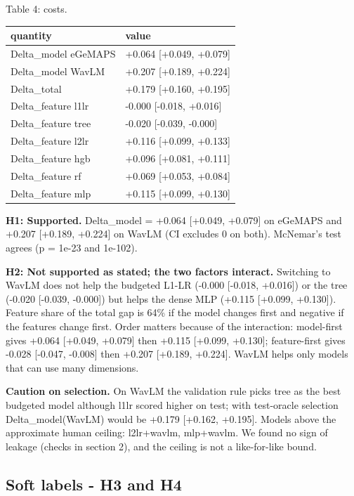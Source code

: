 \documentclass[11pt]{article}
\begin{document}
Table 4: costs.

\begin{longtable}[]{@{}ll@{}}
\toprule\noalign{}
quantity & value \\
\midrule\noalign{}
\endhead
\bottomrule\noalign{}
\endlastfoot
Delta\_model eGeMAPS & +0.064 {[}+0.049, +0.079{]} \\
Delta\_model WavLM & +0.207 {[}+0.189, +0.224{]} \\
Delta\_total & +0.179 {[}+0.160, +0.195{]} \\
Delta\_feature l1lr & -0.000 {[}-0.018, +0.016{]} \\
Delta\_feature tree & -0.020 {[}-0.039, -0.000{]} \\
Delta\_feature l2lr & +0.116 {[}+0.099, +0.133{]} \\
Delta\_feature hgb & +0.096 {[}+0.081, +0.111{]} \\
Delta\_feature rf & +0.069 {[}+0.053, +0.084{]} \\
Delta\_feature mlp & +0.115 {[}+0.099, +0.130{]} \\
\end{longtable}

\textbf{H1: Supported.} Delta\_model = +0.064 {[}+0.049, +0.079{]} on eGeMAPS and +0.207 {[}+0.189, +0.224{]} on WavLM (CI excludes 0 on both). McNemar's test agrees (p = 1e-23 and 1e-102).

\textbf{H2: Not supported as stated; the two factors interact.} Switching to WavLM does not help the budgeted L1-LR (-0.000 {[}-0.018, +0.016{]}) or the tree (-0.020 {[}-0.039, -0.000{]}) but helps the dense MLP (+0.115 {[}+0.099, +0.130{]}). Feature share of the total gap is 64\% if the model changes first and negative if the features change first. Order matters because of the interaction: model-first gives +0.064 {[}+0.049, +0.079{]} then +0.115 {[}+0.099, +0.130{]}; feature-first gives -0.028 {[}-0.047, -0.008{]} then +0.207 {[}+0.189, +0.224{]}. WavLM helps only models that can use many dimensions.

\textbf{Caution on selection.} On WavLM the validation rule picks tree as the best budgeted model although l1lr scored higher on test; with test-oracle selection Delta\_model(WavLM) would be +0.179 {[}+0.162, +0.195{]}. Models above the approximate human ceiling: l2lr+wavlm, mlp+wavlm. We found no sign of leakage (checks in section 2), and the ceiling is not a like-for-like bound.

\subsection{Soft labels - H3 and H4}\label{soft-labels---h3-and-h4}
\end{document}
